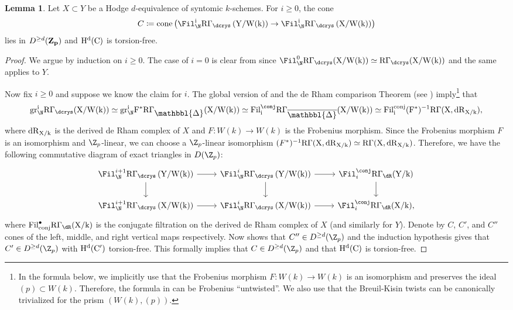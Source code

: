 \documentclass[11pt,reqno]{amsart}
\newcommand{\Prism}{{\mathlarger{\mathbbl{\Delta}}}}
\numberwithin{equation}{section}
\theoremstyle{definition}
\newtheorem{lemma}[thm]{Lemma}
\begin{document}
\begin{lemma}\label{lemma:hodge-equivalence-implies-nygaard} Let $X \subset Y$ be a Hodge $d$-equivalence of syntomic $k$-schemes. For $i\geq 0$, the cone
\[
C\coloneqq \rm{cone}\left(\Fil_\N^i\rm{R}\Gamma_\dcrys\left(Y/W(k)\right) \to \Fil_\N^i \rm{R}\Gamma_\dcrys\left(X/W(k)\right)\right)
\]
lies in $D^{\geq d}(\bf{Z}_p)$ and $\rm{H}^d(C)$ is torsion-free. 
\end{lemma}
\begin{proof}
We argue by induction on $i\geq 0$. The case of $i=0$ is clear from \cite[Rem.~5.2]{ABM} since $\Fil_\N^0 \rm{R}\Gamma_\dcrys(X/W(k))\simeq \rm{R}\Gamma_\dcrys(X/W(k))$ and the same applies to $Y$. \smallskip

Now fix $i \geq 0$ and suppose we know the claim for $i$. The global version of \cite[Rem.~5.1.2]{Bhatt-Lurie} and the de Rham comparison Theorem (see \cite[Prop.~5.2.5]{Bhatt-Lurie}) imply\footnote{In the formula below, we implicitly use that the Frobenius morphism $F\colon W(k) \to W(k)$ is an isomorphism and preserves the ideal $(p)\subset W(k)$. Therefore, the formula in \cite[Prop.~5.2.5]{Bhatt-Lurie} can be Frobenius ``untwisted''. We also use that the Breuil-Kisin twists can be canonically trivialized for the prism $(W(k), (p))$.} that
\[
\rm{gr}^i_\N\rm{R}\Gamma_{\dcrys}(X/W(k)) \simeq \rm{gr}^i_\N F^*\rm{R}\Gamma_{\Prism}(X/W(k)) \simeq \rm{Fil}_i^{\rm{\conj}} \rm{R}\Gamma_{\overline{\Prism}}(X/W(k)) \simeq \rm{Fil}_i^{\rm{conj}} (F^*)^{-1} \rm{R}\Gamma(X, \rm{dR}_{X/k}),
\]
where $\rm{dR}_{X/k}$ is the derived de Rham complex of $X$ and $F\colon W(k) \to W(k)$ is the Frobenius morphism. Since the Frobenius morphism $F$ is an isomorphism and $\Z_p$-linear, we can choose a $\Z_p$-linear isomorphism $(F^*)^{-1} \rm{R}\Gamma(X, \rm{dR}_{X/k}) \simeq \rm{R}\Gamma(X, \rm{dR}_{X/k})$. Therefore, we have the following commutative diagram of exact triangles in $D(\Z_p)$:
\[
\begin{tikzcd}
\Fil_\N^{i+1}\rm{R}\Gamma_\dcrys\left(Y/W(k)\right)\arrow{d} \arrow{r} & \Fil_\N^i\rm{R}\Gamma_\dcrys\left(Y/W(k)\right) \arrow{r}{} \arrow{d} & \Fil^\conj_i\rm{R}\Gamma_{\dR}(Y/k) \arrow{d} \\
\Fil_\N^{i+1}\rm{R}\Gamma_\dcrys\left(X/W(k)\right) \arrow{r} & \Fil_\N^i\rm{R}\Gamma_\dcrys\left(X/W(k)\right) \arrow{r}{} & \Fil^\conj_i\rm{R}\Gamma_{\dR}(X/k),
\end{tikzcd}
\]
where $\rm{Fil}^\bullet_{\rm{conj}}\rm{R}\Gamma_{\dR}(X/k)$ is the conjugate filtration on the derived de Rham complex of $X$ (and similarly for $Y$). Denote by $C$, $C'$, and $C''$ cones of the left, middle, and right vertical maps respectively. Now \cite[Rem.~5.2]{ABM} shows that $C'' \in D^{\geq d}(\Z_p)$ and the induction hypothesis gives that $C'\in D^{\geq d}(\Z_p)$ with $\rm{H}^d(C')$ torsion-free. This formally implies that $C\in D^{\geq d}(\Z_p)$ and that $\rm{H}^d(C)$ is torsion-free.  
\end{proof}
\end{document}
